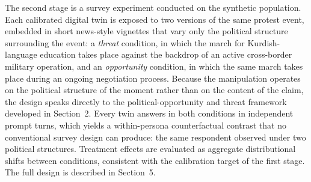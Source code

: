 
The second stage is a survey experiment conducted on the synthetic
population. Each calibrated digital twin is exposed to two versions of the
same protest event, embedded in short news-style vignettes that vary only
the political structure surrounding the event: a \emph{threat} condition, in
which the march for Kurdish-language education takes place against the
backdrop of an active cross-border military operation, and an
\emph{opportunity} condition, in which the same march takes place during an
ongoing negotiation process. Because the manipulation operates on the
political structure of the moment rather than on the content of the claim,
the design speaks directly to the political-opportunity and threat framework
developed in Section~2. Every twin answers in both conditions in independent
prompt turns, which yields a within-persona counterfactual contrast that no
conventional survey design can produce: the same respondent observed under
two political structures. Treatment effects are evaluated as aggregate
distributional shifts between conditions, consistent with the calibration
target of the first stage. The full design is described in Section~5.
